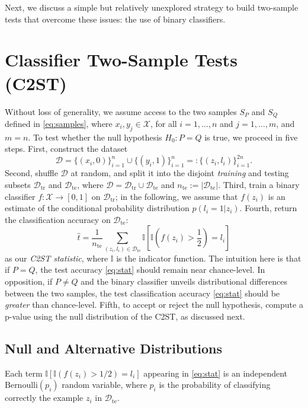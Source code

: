 \documentclass[a4paper]{article}
\begin{document}
  Next, we discuss a simple but relatively unexplored strategy to build two-sample tests
  that overcome these issues: the use of binary classifiers.

  \section{Classifier Two-Sample Tests (C2ST)}\label{sec:neural}

  Without loss of generality, we assume access to the two samples $S_P$ and
  $S_Q$ defined in \eqref{eq:samples}, where $x_i, y_j \in \mathcal{X}$, for
  all $i = 1, \ldots, n$ and $j = 1, \ldots, m$, and $m=n$. To test whether the null
  hypothesis $H_0 : P=Q$ is true, we proceed in five steps.  First, construct
  the dataset
  \begin{equation*}
    \mathcal{D} = \{(x_i, 0)\}_{i=1}^n \cup \{(y_i, 1)\}_{i=1}^n =: \{(z_i, l_i)\}_{i=1}^{2n}.
  \end{equation*}
  Second, shuffle $\mathcal{D}$ at random, and split it into the disjoint \emph{training} and {testing}
  subsets $\mathcal{D}_\text{tr}$ and $\mathcal{D}_\text{te}$, where 
  $\mathcal{D} = \mathcal{D}_\text{tr} \cup \mathcal{D}_\text{te}$ and
  $n_\text{te} := |\mathcal{D}_\text{te}|$. Third, train a binary classifier $f
  : \mathcal{X} \to [0,1]$ on $\mathcal{D}_\text{tr}$; in the following, we assume
  that $f(z_i)$ is an estimate of the conditional probability distribution
  $p(l_i = 1 | z_i)$. Fourth, return the 
  classification accuracy on $\mathcal{D}_\text{te}$:
  \begin{equation}\label{eq:stat}
    \hat{t} = \frac{1}{n_\text{te}} \sum_{(z_i,l_i) \in \mathcal{D}_\text{te}}
    \mathbb{I}\left[ \mathbb{I}\left(f(z_i) > \frac{1}{2}\right) = l_i \right]
  \end{equation}
  as our \emph{C2ST statistic}, where $\mathbb{I}$ is the
  indicator function. The intuition here is that if $P=Q$, the test accuracy
  \eqref{eq:stat} should remain near
  chance-level.  In opposition, if $P \neq Q$ and the binary classifier unveils
  distributional differences between the two samples, the test classification
  accuracy \eqref{eq:stat} should be \emph{greater} than chance-level.
  Fifth, to accept or reject the null hypothesis, compute a
  p-value using the null distribution of the C2ST, as
  discussed next.

  \subsection{Null and Alternative Distributions}\label{sec:null}
  Each term $\mathbb{I}\left[ \mathbb{I}(f(z_i) > 1/2) = l_i\right]$ appearing
  in \eqref{eq:stat} is an independent $\text{Bernoulli}(p_i)$ random variable,
  where $p_i$ is the probability of classifying correctly the example $z_i$ in
  $\mathcal{D}_\text{te}$.
  
\end{document}
